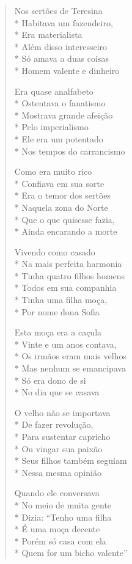 \begin{verse}

Nos sertões de Teresina\\*
Habitava um fazendeiro,\\*
Era materialista\\*
Além disso interesseiro\\*
Só amava a duas coisas\\*
Homem valente e dinheiro

Era quase analfabeto\\*
Ostentava o fanatismo\\*
Mostrava grande afeição\\*
Pelo imperialismo\\*
Ele era um potentado\\*
Nos tempos do carrancismo

Como era muito rico\\*
Confiava em sua sorte\\*
Era o temor dos sertões\\*
Naquela zona do Norte\\*
Que o que quisesse fazia,\\*
Ainda encarando a morte

Vivendo como casado\\*
Na mais perfeita harmonia\\*
Tinha quatro filhos homens\\*
Todos em sua companhia\\*
Tinha uma filha moça,\\*
Por nome dona Sofia

Esta moça era a caçula\\*
Vinte e um anos contava,\\*
Os irmãos eram mais velhos\\*
Mas nenhum se emancipava\\*
Só era dono de si\\*
No dia que se casava

O velho não se importava\\*
De fazer revolução,\\*
Para sustentar capricho\\*
Ou vingar sua paixão\\*
Seus filhos também seguiam\\*
Nessa mesma opinião

Quando ele conversava\\*
No meio de muita gente\\*
Dizia: ``Tenho uma filha\\*
É uma moça decente\\*
Porém só casa com ela\\*
Quem for um bicho valente''


\end{verse}
